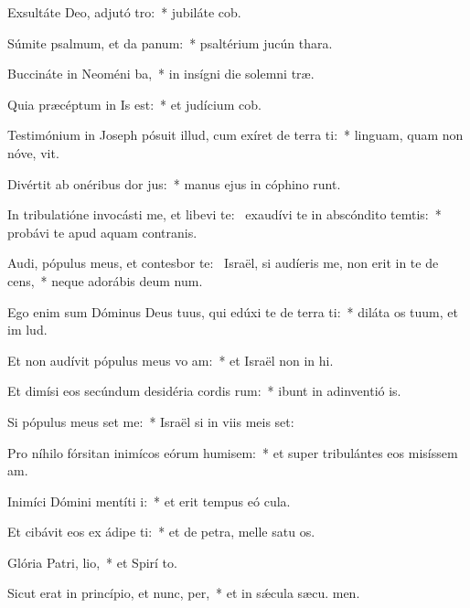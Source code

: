 \item Exsultáte Deo, adjutó tro:~* jubiláte  cob.
\item Súmite psalmum, et da panum:~* psaltérium jucún  thara.
\item Buccináte in Neoméni ba,~* in insígni die solemni træ.
\item Quia præcéptum in Is est:~* et judícium  cob.
\item Testimónium in Joseph pósuit illud, cum exíret de terra ti:~* linguam, quam non nóve, vit.
\item Divértit ab onéribus dor jus:~* manus ejus in cóphino runt.
\item In tribulatióne invocásti me, et libevi te:~\pscross{} exaudívi te in abscóndito temtis:~* probávi te apud aquam contranis.
\item Audi, pópulus meus, et contesbor te:~\pscross{} Israël, si audíeris me, non erit in te de cens,~* neque adorábis deum num.
\item Ego enim sum Dóminus Deus tuus, qui edúxi te de terra ti:~* diláta os tuum, et im lud.
\item Et non audívit pópulus meus vo am:~* et Israël non in hi.
\item Et dimísi eos secúndum desidéria cordis rum:~* ibunt in adinventió is.
\item Si pópulus meus set me:~* Israël si in viis meis set:
\item Pro níhilo fórsitan inimícos eórum humisem:~* et super tribulántes eos misíssem  am.
\item Inimíci Dómini mentíti  i:~* et erit tempus eó  cula.
\item Et cibávit eos ex ádipe ti:~* et de petra, melle satu os.
\item Glória Patri,  lio,~* et Spirí to.
\item Sicut erat in princípio, et nunc,  per,~* et in sǽcula sæcu. men.
